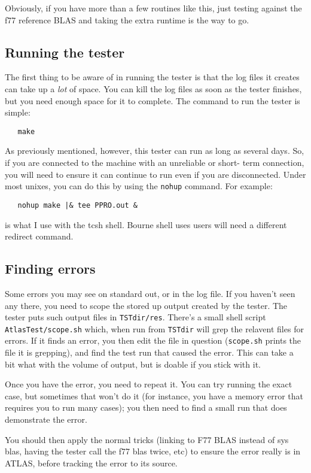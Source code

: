 \documentclass[11pt]{article}
\begin{document}
Obviously, if you have more than a few routines like this, just testing
against the f77 reference BLAS and taking the extra runtime is the way to
go.


\subsection{Running the tester}
The first thing to be aware of in running the tester is that the log files
it creates can take up a {\em lot} of space.  You can kill the log files
as soon as the tester finishes, but you need enough space for it to complete.
The command to run the tester is simple:
\begin{verbatim}
   make
\end{verbatim}

As previously mentioned, however, this tester can run as long as several
days.  So, if you are connected to the machine with an unreliable or short-
term connection, you will need to ensure it can continue to run even if
you are disconnected.  Under most unixes, you can do this by using the
{\tt nohup} command.  For example:
\begin{verbatim}
   nohup make |& tee PPRO.out &
\end{verbatim}
is what I use with the tcsh shell.  Bourne shell uses users will need a
different redirect command.

\subsection{Finding errors}
Some errors you may see on standard out, or in the log file.  If you haven't
seen any there, you need to scope the stored up output created by the tester.
The tester puts such output files in {\tt TSTdir/res}.  There's a
small shell script {\tt AtlasTest/scope.sh} which, when run from
{\tt TSTdir} will grep the relavent files for errors.  If it finds an error,
you then edit the file in question ({\tt scope.sh} prints the file it is
grepping),
and find the test run that caused the error.  This can take a bit what with
the volume of output, but is doable if you stick with it.

Once you have the error, you need to repeat it.  You can try running the
exact case, but sometimes that won't do it (for instance, you have a memory
error that requires you to run many cases); you then need to find a small
run that does demonstrate the error.

You should then apply the normal tricks (linking to F77 BLAS instead of
sys blas, having the tester call the f77 blas twice, etc) to ensure the
error really is in ATLAS, before tracking the error to its source.
\end{document}
